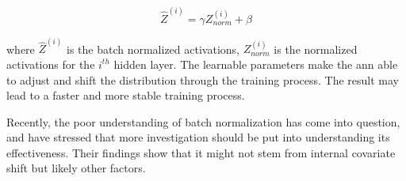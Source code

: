         \begin{equation} \label{batch_normalization}
            \hat{Z}^{(i)} =   \gamma Z^{(i)}_{norm} + \beta
        \end{equation}
    
    where $\hat{Z}^{(i)}$ is the batch normalized activations, $Z^{(i)}_{norm}$ is the normalized activations for the $i^{th}$ hidden layer. The learnable parameters make the \gls{ann} able to adjust and shift the distribution through the training process. The result may lead to a faster and more stable training process. 
    
    Recently, the poor understanding of batch normalization has come into question, and \citet{batch_norm_not_work} have stressed that more investigation should be put into understanding its effectiveness. Their findings show that it might not stem from internal covariate shift but likely other factors. 

